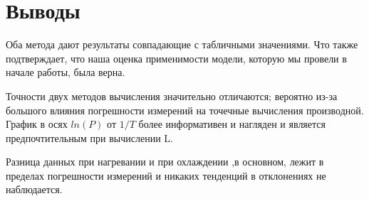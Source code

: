 \newpage

 \section{Выводы}
 
Оба метода дают результаты совпадающие с табличными значениями. Что также подтверждает, что наша оценка применимости модели, которую мы провели в начале работы, была верна.

Точности двух методов вычисления значительно отличаются; вероятно из-за большого влияния погрешности измерений на точечные вычисления производной. График в осях $ln(P)$ от $1/T$ более информативен и нагляден и является предпочтительным при вычислении L.

Разница данных при нагревании и при охлаждении ,в основном, лежит в пределах погрешности измерений и никаких тенденций в отклонениях не наблюдается. \\



